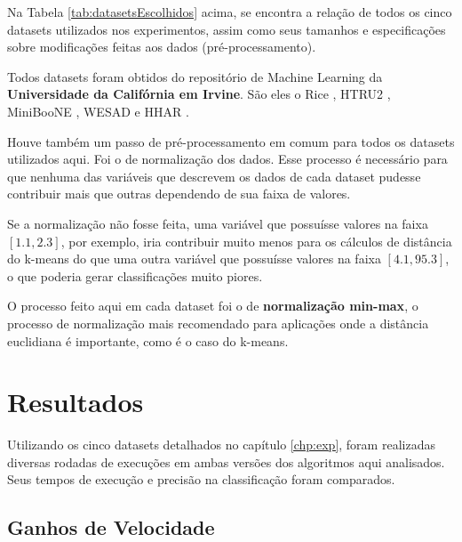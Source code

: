 \documentclass[12pt,
openright, 
oneside, %
a4paper,    %
brazil]{facom-ufu-abntex2}
\begin{document}
Na Tabela \ref{tab:datasetsEscolhidos} acima, se encontra a relação de todos os cinco datasets utilizados nos experimentos, assim como seus tamanhos e especificações sobre modificações feitas aos dados (pré-processamento).

Todos datasets foram obtidos do repositório de Machine Learning da \textbf{Universidade da Califórnia em Irvine}. São eles o Rice \cite{riceDataset}, HTRU2 \cite{htru2Dataset}, MiniBooNE \cite{minibooneDataset}, WESAD \cite{wesadDataset} e HHAR \cite{htru2Dataset}.

Houve também um passo de pré-processamento em comum para todos os datasets utilizados aqui. Foi o de normalização dos dados. Esse processo é necessário para que nenhuma das variáveis que descrevem os dados de cada dataset pudesse contribuir mais que outras dependendo de sua faixa de valores.

Se a normalização não fosse feita, uma variável que possuísse valores na faixa $[1.1, 2.3]$, por exemplo, iria contribuir muito menos para os cálculos de distância do k-means do que uma outra variável que possuísse valores na faixa $[4.1, 95.3]$, o que poderia gerar classificações muito piores.

O processo feito aqui em cada dataset foi o de \textbf{normalização min-max}, o processo de normalização mais recomendado \cite{standardizOfVars1988} para aplicações onde a distância euclidiana é importante, como é o caso do k-means.






\chapter{Resultados}
\label{chp:resultados}

Utilizando os cinco datasets detalhados no capítulo \ref{chp:exp}, foram realizadas diversas rodadas de execuções em ambas versões dos algoritmos aqui analisados. Seus tempos de execução e precisão na classificação foram comparados.




\section{Ganhos de Velocidade}
\label{sec:testesDeSpeedup}
\end{document}
